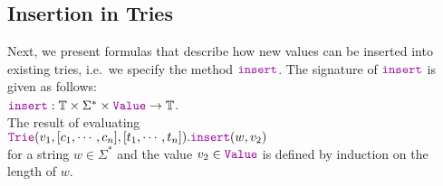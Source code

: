 \subsection{Insertion in Tries}
Next, we present formulas that describe how new values can be inserted into existing tries,
i.e.~we specify the method $\mytt{insert}$.  The signature of $\mytt{insert}$ is given as follows:
\\[0.2cm]
\hspace*{1.3cm}
$\mytt{insert}: \mathbb{T} \times \Sigma^* \times \mytt{Value} \rightarrow \mathbb{T}$.
\\[0.2cm]
The result of evaluating \\[0.2cm]
\hspace*{1.3cm} 
$\mytt{Trie}(v_1, [c_1, \cdots, c_n], [t_1, \cdots, t_n]).\mytt{insert}(w, v_2)$
\\[0.2cm]
for a string $w\in \Sigma^*$ and the value $v_2 \in \mytt{Value}$ is defined by induction on the
length of $w$.
